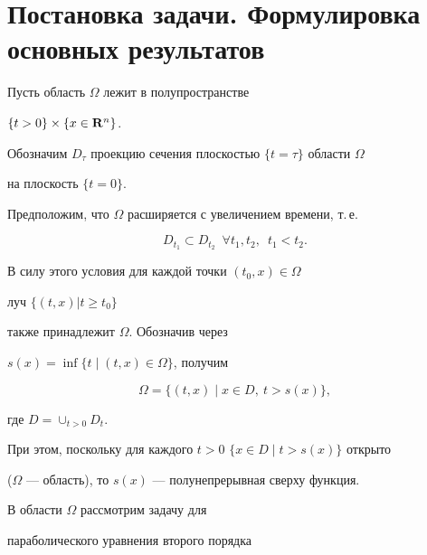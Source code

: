 \label{begin}





\section{Постановка задачи. Формулировка основных результатов}





Пусть область $\Omega$ лежит в полупространстве 


$\{ t>0\}\times \{x \in {\bold R}^n\}$.


Обозначим $D_\tau$ проекцию сечения плоскостью $\{t=\tau\}$ области $\Omega$ 


на плоскость $\{t=0\}$.


Предположим, что $\Omega$ расширяется с увеличением времени, т.\,е.


\begin{equation}


D_{t_1} \subset D_{t_2}\ \; \forall t_1,t_2, \ \; t_1<t_2.


\label{usl_rassh}


\end{equation} 


В силу этого условия для каждой точки $(t_0,x)\in \Omega$


луч $\{ (t,x)| t \geq t_0 \}$


также принадлежит $\Omega$. Обозначив через


$ s(x)=\inf\{ t\mid(t,x) \in \Omega\}$, получим


\begin{equation}


\Omega =\{ (t,x)\mid x\in D,\ t>s(x)\},


\label{vid_gr}


\end{equation}


где $D=\cup_{t>0} D_t$.


При этом, поскольку для каждого $t>0$\; $\{ x\in D\mid t>s(x)\}$ открыто


($\Omega$ --- область), то $s(x)$ --- полунепрерывная сверху функция.





В области $\Omega$ рассмотрим задачу для 


параболического уравнения второго порядка


